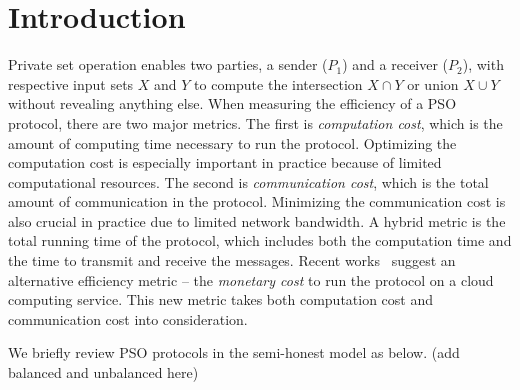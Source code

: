 \documentclass[a4paper,10pt]{article}
\begin{document}
\thispagestyle{empty}

\newpage
\setcounter{tocdepth}{2}
\tableofcontents
\newpage

\pagestyle{plain}
\setcounter{page}{1}
	
	

\section{Introduction}\label{sec:introduction}
Private set operation enables two parties, a sender ($P_1$) and a receiver ($P_2$), with respective input sets $X$ and $Y$ 
to compute the intersection $X \cap Y$ or union $X \cup Y$ without revealing anything else. 
When measuring the efficiency of a PSO protocol, there are two major metrics. 
The first is \emph{computation cost}, which is the amount of computing time necessary to run the protocol. 
Optimizing the computation cost is especially important in practice because of limited computational resources. 
The second is \emph{communication cost},  which is the total amount of communication in the protocol. 
Minimizing the communication cost is also crucial in practice due to limited network bandwidth. 
A hybrid metric is the total running time of the protocol, which includes both the computation time 
and the time to transmit and receive the messages. 
Recent works~\cite{PRTY-CRYPTO-2019, Ion-EUROSP-2020} suggest an alternative efficiency metric -- 
the \emph{monetary cost} to run the protocol 
on a cloud computing service. This new metric takes both computation cost and communication cost into consideration.  

We briefly review PSO protocols in the semi-honest model as below. (add balanced and unbalanced here)
\end{document}
